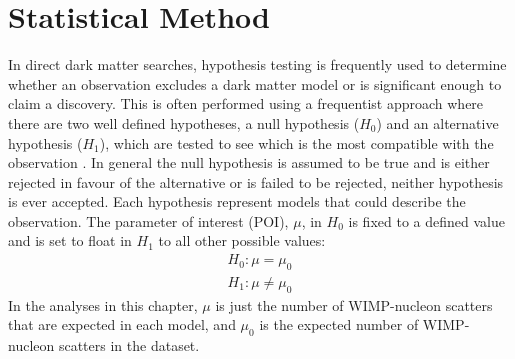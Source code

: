 \section{Statistical Method}

\par
In direct dark matter searches, hypothesis testing is frequently used to determine whether an observation excludes a dark matter model or is significant enough to claim a discovery.
This is often performed using a frequentist approach where there are two well defined hypotheses, a null hypothesis ($H_0$) and an alternative hypothesis ($H_1$), which are tested to see which is the most compatible with the observation \cite{likelihood_testing_ref}.
In general the null hypothesis is assumed to be true and is either rejected in favour of the alternative or is failed to be rejected, neither hypothesis is ever accepted.
Each hypothesis represent models that could describe the observation.
The parameter of interest (POI), $\mu$, in $H_0$ is fixed to a defined value and is set to float in $H_1$ to all other possible values:
\begin{equation}
    \begin{split}
        H_0: \mu = \mu_0 \\
        H_1: \mu \neq \mu_0
    \end{split}
\end{equation}
In the analyses in this chapter, $\mu$ is just the number of WIMP-nucleon scatters that are expected in each model, and $\mu_0$ is the expected number of WIMP-nucleon scatters in the dataset.

